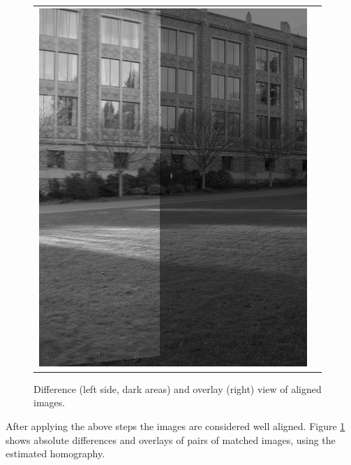 \begin{figure}[h]
\begin{tabular}{cc}
	\includegraphics[width=\mywidth]{figures/overlay2.png} 

	\end{tabular}
	\caption{Difference (left side, dark areas) and overlay (right) view of aligned images.}
	\label{fig:a4:diffs}
\end{figure}


After applying the above steps the images are considered well aligned. Figure \ref{fig:a4:diffs} shows absolute differences and overlays of pairs of matched images, using the estimated homography.



